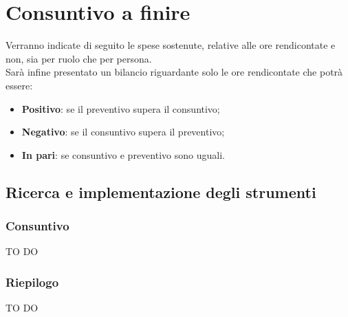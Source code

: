 %


\section{Consuntivo a finire} %
\label{sec:consuntivo_a_finire}
Verranno indicate di seguito le spese sostenute, relative alle ore rendicontate e non, sia per ruolo che per persona. \\
Sarà infine presentato un bilancio riguardante solo le ore rendicontate che potrà essere:
	\begin{itemize}
		\item \textbf{Positivo}: se il preventivo supera il consuntivo;
		\item \textbf{Negativo}: se il consuntivo supera il preventivo;
		\item \textbf{In pari}: se consuntivo e preventivo sono uguali.
	\end{itemize}
	\subsection{Ricerca e implementazione degli strumenti} %
	\label{sub:ricerca_e_implementazione_degli_strumenti}
		\subsubsection{Consuntivo} %
		\label{ssub:consuntivo}
		TO DO
		
		\subsubsection{Riepilogo} %
		\label{ssub:riepilogo}
		TO DO
		
